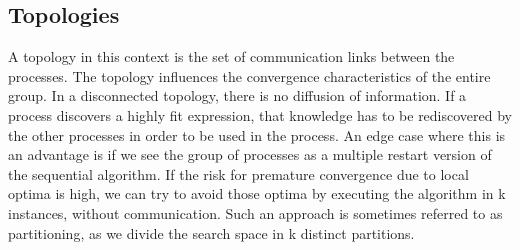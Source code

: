 %
%
%

\subsection{Topologies}
A topology in this context is the set of communication links between the processes. The topology influences the convergence characteristics of the entire group. In a disconnected topology, there is no diffusion of information. If a process discovers a highly fit expression, that knowledge has to be rediscovered by the other processes in order to be used in the process. An edge case where this is an advantage is if we see the group of processes as a multiple restart version of the sequential algorithm. If the risk for premature convergence due to local optima is high, we can try to avoid those optima by executing the algorithm in k instances, without communication. Such an approach is sometimes referred to as partitioning, as we divide the search space in k distinct partitions.

